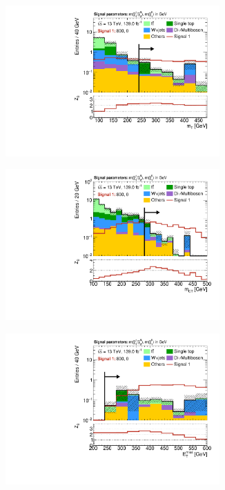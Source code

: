 \begin{figure}
	\centering
	\begin{subfigure}[b]{0.5\linewidth}
		\centering\includegraphics[width=0.9\textwidth]{N-1_cut_scan/n1_800_0/mt}
	\end{subfigure}\hfill
	\begin{subfigure}[b]{0.5\linewidth}
		\centering\includegraphics[width=0.9\textwidth]{N-1_cut_scan/n1_800_0/mct}
	\end{subfigure}\hfill
	\begin{subfigure}[b]{0.5\linewidth}
		\centering\includegraphics[width=0.9\textwidth]{N-1_cut_scan/n1_800_0/met}

\end{subfigure}
\end{figure}
